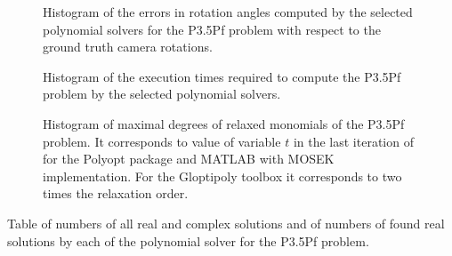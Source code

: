 \begin{figure}[ht]
  \centering
  \resizebox{0.95\textwidth}{!}{}
  \caption{Histogram of the errors in rotation angles computed by the selected polynomial solvers for the P3.5Pf problem with respect to the ground truth camera rotations.}
\end{figure}

\begin{figure}[ht]
  \centering
  \resizebox{0.95\textwidth}{!}{}
  \caption{Histogram of the execution times required to compute the P3.5Pf problem by the selected polynomial solvers.}
\end{figure}

\begin{figure}[ht]
  \centering
  \resizebox{0.95\textwidth}{!}{}
  \caption{Histogram of maximal degrees of relaxed monomials of the P3.5Pf problem. It corresponds to value of variable $t$ in the last iteration of  for the Polyopt package and MATLAB with MOSEK implementation. For the Gloptipoly toolbox it corresponds to two times the relaxation order.}
\end{figure}

\begin{table}[ht]
  \centering
  
  \caption{Table of numbers of all real and complex solutions and of numbers of found real solutions by each of the polynomial solver for the P3.5Pf problem.}
\end{table}
